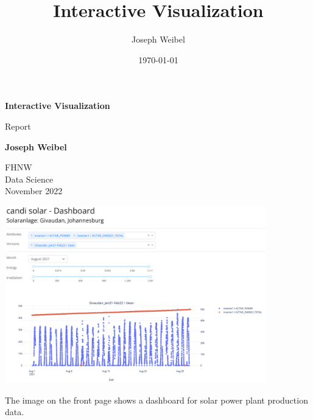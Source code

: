 \documentclass[11pt]{article}
\title{Interactive Visualization}
\author{Joseph Weibel}
\date{\today}
\begin{document}
\begin{titlepage}
    \begin{center}
        \vspace*{0.4cm}

        \Huge
        \textbf{Interactive Visualization}

        \vspace{0.3cm}
        \LARGE
        Report

        \vspace{0.8cm}

        \textbf{Joseph Weibel}

        \vspace{0.3cm}

        \Large
        FHNW\\
        Data Science\\
        November 2022

        \vfill

        \includegraphics[width=0.85\textwidth]{./cover.png}

        \vspace{2.0cm}

    \end{center}
\end{titlepage}
\pagebreak

\tableofcontents

\vfill

\small The image on the front page shows a dashboard for solar power plant production data.
\normalsize
\pagebreak
\end{document}
